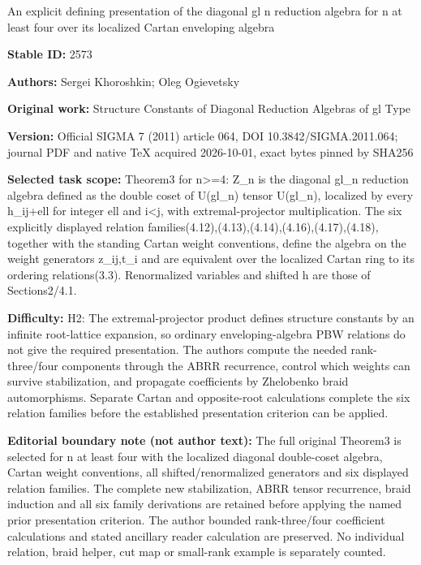 \documentclass[11pt]{article}
\numberwithin{equation}{section}
\begin{document}
\begin{center}\Large An explicit defining presentation of the diagonal gl n reduction algebra for n at least four over its localized Cartan enveloping algebra\end{center}
\noindent\textbf{Stable ID:} 2573\par
\noindent\textbf{Authors:} Sergei Khoroshkin; Oleg Ogievetsky\par
\noindent\textbf{Original work:} Structure Constants of Diagonal Reduction Algebras of gl Type\par
\noindent\textbf{Version:} Official SIGMA 7 (2011) article 064, DOI 10.3842/SIGMA.2011.064; journal PDF and native TeX acquired 2026-10-01, exact bytes pinned by SHA256\par
\noindent\textbf{Selected task scope:} Theorem3 for n>=\allowbreak{}4: Z\_n is the diagonal gl\_n reduction algebra defined as the double coset of U(gl\_n) tensor U(gl\_n), localized by every h\_ij+\allowbreak{}ell for integer ell and i<j, with extremal-projector multiplication. The six explicitly displayed relation families(4.12),(4.13),(4.14),(4.16),(4.17),(4.18), together with the standing Cartan weight conventions, define the algebra on the weight generators z\_ij,t\_i and are equivalent over the localized Cartan ring to its ordering relations(3.3). Renormalized variables and shifted h are those of Sections2/4.1.\par
\noindent\textbf{Difficulty:} H2: The extremal-projector product defines structure constants by an infinite root-lattice expansion, so ordinary enveloping-algebra PBW relations do not give the required presentation. The authors compute the needed rank-three/four components through the ABRR recurrence, control which weights can survive stabilization, and propagate coefficients by Zhelobenko braid automorphisms. Separate Cartan and opposite-root calculations complete the six relation families before the established presentation criterion can be applied.\par
\noindent\textbf{Editorial boundary note (not author text):} The full original Theorem3 is selected for n at least four with the localized diagonal double-coset algebra, Cartan weight conventions, all shifted/renormalized generators and six displayed relation families. The complete new stabilization, ABRR tensor recurrence, braid induction and all six family derivations are retained before applying the named prior presentation criterion. The author bounded rank-three/four coefficient calculations and stated ancillary reader calculation are preserved. No individual relation, braid helper, cut map or small-rank example is separately counted.\par
\end{document}
